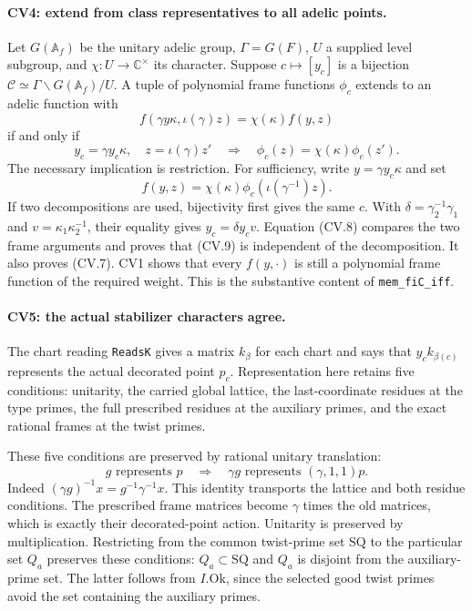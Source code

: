\documentclass[11pt,a4paper]{article}
\numberwithin{equation}{section}
\theoremstyle{remark}\newtheorem{remark}[theorem]{Remark}
\begin{document}
\paragraph{CV4: extend from class representatives to all adelic points.}
Let \(G(\mathbb A_f)\) be the unitary adelic group,
\(\Gamma=G(F)\), \(U\) a supplied level subgroup, and
\(\chi:U\to\mathbb C^\times\) its character. Suppose
\(c\mapsto[y_c]\) is a bijection
\(\mathcal C\simeq\Gamma\backslash G(\mathbb A_f)/U\).
A tuple of polynomial frame functions \(\phi_c\) extends
to an adelic function with
\[
 f(\gamma y\kappa,\iota(\gamma)z)=\chi(\kappa)f(y,z)
                                                               \tag{CV.7}
\]
if and only if
\[
 y_c=\gamma y_c\kappa,\quad z=\iota(\gamma)z'
       \quad\Longrightarrow\quad
             \phi_c(z)=\chi(\kappa)\phi_c(z').                  \tag{CV.8}
\]
The necessary implication is restriction. For sufficiency,
write \(y=\gamma y_c\kappa\) and set
\[
             f(y,z)=\chi(\kappa)
                          \phi_c(\iota(\gamma^{-1})z).         \tag{CV.9}
\]
If two decompositions are used, bijectivity first gives the
same \(c\). With
\(\delta=\gamma_2^{-1}\gamma_1\) and
\(v=\kappa_1\kappa_2^{-1}\), their equality gives
\(y_c=\delta y_cv\). Equation (CV.8) compares the two
frame arguments and proves that (CV.9) is independent of
the decomposition. It also proves (CV.7).
CV1 shows that every \(f(y,\cdot)\) is still a polynomial
frame function of the required weight. This is the
substantive content of \texttt{mem\_\allowbreak fiC\_\allowbreak iff}.

\paragraph{CV5: the actual stabilizer characters agree.}
The chart reading \texttt{ReadsK} gives a matrix \(k_\beta\)
for each chart and says that \(y_ck_{\beta(c)}\) represents
the actual decorated point \(p_c\). Representation here
retains five conditions: unitarity, the carried global
lattice, the last-coordinate residues at the type primes,
the full prescribed residues at the auxiliary primes, and
the exact rational frames at the twist primes.

These five conditions are preserved by rational unitary
translation:
\[
       g\text{ represents }p
       \quad\Longrightarrow\quad
       \gamma g\text{ represents }(\gamma,1,1)p.
                                                               \tag{CV.10}
\]
Indeed
\((\gamma g)^{-1}x=g^{-1}\gamma^{-1}x\).
This identity transports the lattice and both residue
conditions. The prescribed frame matrices become
\(\gamma\) times the old matrices, which is exactly their
decorated-point action. Unitarity is preserved by
multiplication. Restricting from the common twist-prime set
\(\mathrm{SQ}\) to the particular set \(Q_a\) preserves
these conditions: \(Q_a\subset\mathrm{SQ}\) and
\(Q_a\) is disjoint from the auxiliary-prime set. The latter
follows from \(I.\mathrm{Ok}\), since the selected good
twist primes avoid the set containing the auxiliary primes.
\end{document}
